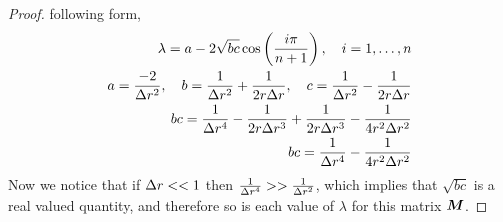 \documentclass{article}
\begin{document}
\begin{enumerate}[label=\alph*)]
\begin{proof}
            following form, 
            \begin{align*}
                \lambda = a - 2\sqrt{bc}\cos\left(\frac{i\pi}{n+1}\right), \quad
                i = 1, \ldots, n\\
                a = \frac{-2}{\Delta r^2}, \quad b = \frac{1}{\Delta r^2} +
                \frac{1}{2r\Delta r}, \quad c = \frac{1}{\Delta r^2} -
                \frac{1}{2r\Delta r}\\
                bc = \frac{1}{\Delta r^4} - \frac{1}{2r\Delta r^3} + \frac{1}{2r\Delta r^3} -
                \frac{1}{4r^2\Delta r^2}\\
                bc = \frac{1}{\Delta r^4} - \frac{1}{4r^2\Delta r^2}
            \end{align*}
            Now we notice that if $\Delta r << 1$ then $\frac{1}{\Delta r^4} >>
            \frac{1}{\Delta r^2}$, which implies that $\sqrt{bc}$ is a real valued
            quantity, and therefore so is each value of $\lambda$ for this
            matrix $\boldsymbol{M}$. 


\end{proof}
\end{enumerate}
\end{document}
